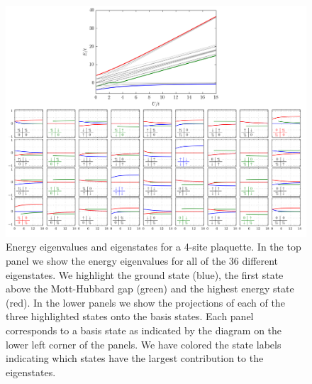 \begin{figure}
\centering
\includegraphics[width=1.0\textwidth]{../figures/hubbard/Ut_eigenvalues_4site.png}
\caption[Exact diagonalization results for a 4-site plaquette.]{\small Energy
eigenvalues and eigenstates for a 4-site plaquette.  In the top panel we show
the energy eigenvalues for all of the 36 different eigenstates.  We highlight
the ground state (blue),  the first state above the Mott-Hubbard gap (green)
and the highest energy state (red).  In the lower panels we show the
projections of each of the three highlighted states onto the basis states.
Each panel corresponds to a basis state as indicated by the diagram on the
lower left corner of the panels.  We have colored the state labels indicating
which states have the largest contribution to the eigenstates.    } 
\label{fig:exact_4site} 
\end{figure}

